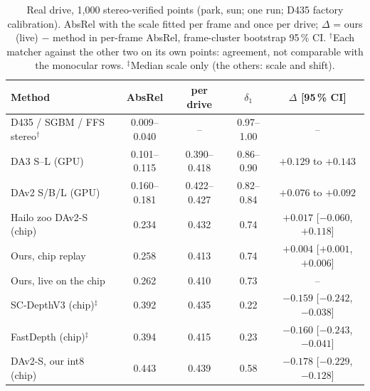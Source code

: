 \documentclass[conference]{IEEEtran}
\begin{document}
\begin{table}[t]
\centering\footnotesize
\setlength{\tabcolsep}{6pt}
\caption{Real drive, 1{,}000 stereo-verified points (park, sun; one run; D435 factory calibration). AbsRel with the scale fitted per frame and once per
drive; $\Delta$ = ours (live) $-$ method in per-frame AbsRel, frame-cluster bootstrap 95\,\% CI. $^\dagger$Each matcher against the
other two on its own points: agreement, not comparable with the monocular rows. $^\ddagger$Median scale only (the others: scale and shift).}
\label{tab:real}
\begin{tabular}{@{}lcccc@{}}
\toprule
Method & AbsRel & per drive & $\delta_1$ & $\Delta$ [95\,\% CI] \\
\midrule
D435 / SGBM / FFS stereo$^\dagger$ & 0.009--0.040 & -- & 0.97--1.00 & -- \\
DA3 S--L (GPU) & 0.101--0.115 & 0.390--0.418 & 0.86--0.90 & $+0.129$ to $+0.143$ \\
DAv2 S/B/L (GPU) & 0.160--0.181 & 0.422--0.427 & 0.82--0.84 & $+0.076$ to $+0.092$ \\
Hailo zoo DAv2-S (chip) & 0.234 & 0.432 & 0.74 & $+0.017$ [$-0.060$, $+0.118$] \\
Ours, chip replay & 0.258 & 0.413 & 0.74 & $+0.004$ [$+0.001$, $+0.006$] \\
Ours, live on the chip & 0.262 & 0.410 & 0.73 & -- \\
SC-DepthV3 (chip)$^\ddagger$ & 0.392 & 0.435 & 0.22 & $-0.159$ [$-0.242$, $-0.038$] \\
FastDepth (chip)$^\ddagger$ & 0.394 & 0.415 & 0.23 & $-0.160$ [$-0.243$, $-0.041$] \\
DAv2-S, our int8 (chip) & 0.443 & 0.439 & 0.58 & $-0.178$ [$-0.229$, $-0.128$] \\
\bottomrule
\end{tabular}
\end{table}
\end{document}

